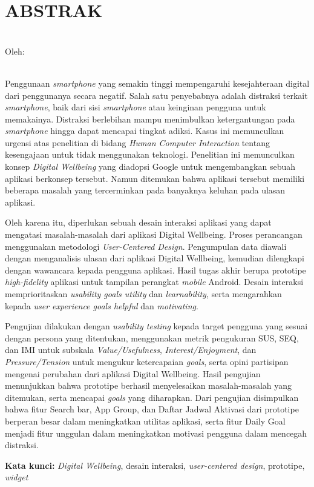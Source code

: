 \clearpage
\chapter*{ABSTRAK}

\begin{center}
  \textbf{\MakeUppercase{\thetitle}} \\[1em]
  
  Oleh: \\
  \MakeUppercase{\theauthor} \\
\end{center}

\begin{singlespace}
  Penggunaan \textit{smartphone} yang semakin tinggi mempengaruhi kesejahteraan digital dari penggunanya secara negatif.
  Salah satu penyebabnya adalah distraksi terkait \textit{smartphone}, baik dari sisi \textit{smartphone} atau keinginan pengguna untuk memakainya.
  Distraksi berlebihan mampu menimbulkan ketergantungan pada \textit{smartphone} hingga dapat mencapai tingkat adiksi.
  Kasus ini memunculkan urgensi atas penelitian di bidang \textit{Human Computer Interaction} tentang kesengajaan untuk tidak menggunakan teknologi.
  Penelitian ini memunculkan konsep \textit{Digital Wellbeing} yang diadopsi Google untuk mengembangkan sebuah aplikasi berkonsep tersebut.
  Namun ditemukan bahwa aplikasi tersebut memiliki beberapa masalah yang tercerminkan pada banyaknya keluhan pada ulasan aplikasi.
  
  Oleh karena itu, diperlukan sebuah desain interaksi aplikasi yang dapat mengatasi masalah-masalah dari aplikasi Digital Wellbeing.
  Proses perancangan menggunakan metodologi \textit{User-Centered Design}.
  Pengumpulan data diawali dengan menganalisis ulasan dari aplikasi Digital Wellbeing, kemudian dilengkapi dengan wawancara kepada pengguna aplikasi.
  Hasil tugas akhir berupa prototipe \textit{high-fidelity} aplikasi untuk tampilan perangkat \textit{mobile} Android.
  Desain interaksi memprioritaskan \textit{usability goals utility} dan \textit{learnability}, serta mengarahkan kepada \textit{user experience goals helpful} dan \textit{motivating}.
  
  Pengujian dilakukan dengan \textit{usability testing} kepada target pengguna yang sesuai dengan persona yang ditentukan, menggunakan metrik pengukuran SUS, SEQ, dan IMI untuk subskala \textit{Value/Usefulness}, \textit{Interest/Enjoyment}, dan \textit{Pressure/Tension} untuk mengukur ketercapaian \textit{goals}, serta opini partisipan mengenai perubahan dari aplikasi Digital Wellbeing.
  Hasil pengujian menunjukkan bahwa prototipe berhasil menyelesaikan masalah-masalah yang ditemukan, serta mencapai \textit{goals} yang diharapkan.
  Dari pengujian disimpulkan bahwa fitur Search bar, App Group, dan Daftar Jadwal Aktivasi dari prototipe berperan besar dalam meningkatkan utilitas aplikasi, serta fitur Daily Goal menjadi fitur unggulan dalam meningkatkan motivasi pengguna dalam mencegah distraksi.

\noindent \textbf{Kata kunci:} \textit{Digital Wellbeing}, desain interaksi, \textit{user-centered design}, prototipe, \textit{widget}
\end{singlespace}